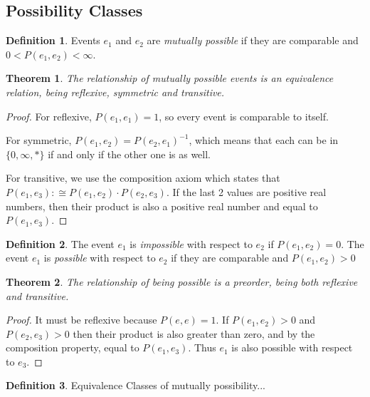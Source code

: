 \documentclass[twoside]{article}
\theoremstyle{plain}%
\newtheorem{theorem}{Theorem}[section]
\theoremstyle{definition}
\newtheorem{definition}{Definition}[section]
\theoremstyle{remark}
\begin{document}
\subsection{Possibility Classes}

\begin{definition}
Events \(e_1\) and \(e_2\) are \textit{mutually possible} if they are comparable and \(0 < P(e_1, e_2) < \infty\).
\end{definition}

\begin{theorem}
The relationship of mutually possible events is an \textit{equivalence relation}, being reflexive, symmetric and transitive.
\end{theorem}

\begin{proof}
For reflexive, \(P(e_1, e_1) = 1\), so every event is comparable to itself.

For symmetric, \(P(e_1, e_2) = P(e_2, e_1)^{-1}\), which means that each can be in \(\{0, \infty, \ast\}\) if and only if the other one is as well.

For transitive, we use the composition axiom which states that \(P(e_1, e_3) :\cong P(e_1, e_2) \cdot P(e_2, e_3)\). If the last 2 values are positive real numbers, then their product is also a positive real number and equal to \(P(e_1, e_3)\).
\end{proof}

\begin{definition}
The event \(e_1\) is \textit{impossible} with respect to \(e_2\) if \(P(e_1, e_2) = 0\). The event \(e_1\) is \textit{possible} with respect to \(e_2\) if they are comparable and \(P(e_1, e_2) > 0\)
\end{definition}

\begin{theorem}
The relationship of being possible is a \textit{preorder}, being both reflexive and transitive.
\end{theorem}

\begin{proof}
It must be reflexive because \(P(e, e) = 1\). If \(P(e_1, e_2) > 0\) and \(P(e_2, e_3) > 0\) then their product is also greater than zero, and by the composition property, equal to \(P(e_1, e_3)\). Thus \(e_1\) is also possible with respect to \(e_3\).
\end{proof}

\begin{definition}
Equivalence Classes of mutually possibility...
\end{definition}
\end{document}
